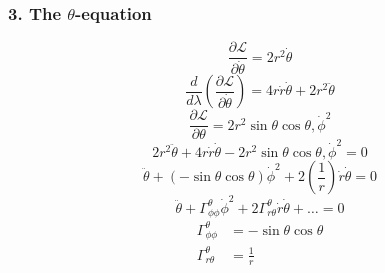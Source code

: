 \documentclass[11pt, a4paper]{report}
\begin{document}
\subsubsection*{3. The $\theta$-equation}
\begin{equation}
\frac{\partial \mathcal{L}}{\partial \dot{\theta}} = 2r^2 \dot{\theta}
\end{equation}
\begin{equation}
\frac{d}{d\lambda} \left( \frac{\partial \mathcal{L}}{\partial \dot{\theta}} \right) = 4r\dot{r}\dot{\theta} + 2r^2 \ddot{\theta}
\end{equation}
\begin{equation}
\frac{\partial \mathcal{L}}{\partial \theta} = 2r^2 \sin\theta \cos\theta , \dot{\phi}^2
\end{equation}
\begin{equation}
2r^2 \ddot{\theta} + 4r\dot{r}\dot{\theta} - 2r^2 \sin\theta \cos\theta , \dot{\phi}^2 = 0
\end{equation}
\begin{equation}
\ddot{\theta} + (-\sin\theta \cos\theta) \dot{\phi}^2 + 2 \left(\frac{1}{r}\right) \dot{r}\dot{\theta} = 0 \label{eq:geo_theta}
\end{equation}
\begin{equation}
\ddot{\theta} + \Gamma^\theta_{\phi\phi}\dot{\phi}^2 + 2\Gamma^\theta_{r\theta}\dot{r}\dot{\theta} + \dots = 0
\end{equation}
\begin{align}
\Gamma^\theta_{\phi\phi} &= -\sin\theta \cos\theta \\
\Gamma^\theta_{r\theta} &= \frac{1}{r}
\end{align}
\end{document}

